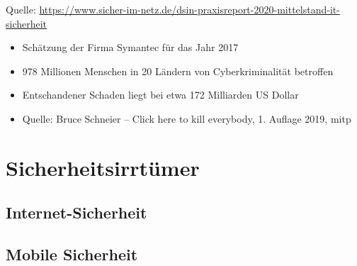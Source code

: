 \begin{frame}
\begin{center}

\end{center}
\scriptsize Quelle: \href{https://www.sicher-im-netz.de/dsin-praxisreport-2020-mittelstand-it-sicherheit}{https://www.sicher-im-netz.de/dsin-praxisreport-2020-mittelstand-it-sicherheit}
\end{frame}


\begin{frame}
\begin{itemize}
  \item Schätzung der Firma Symantec für das Jahr 2017
  \item 978 Millionen Menschen in 20 Ländern von Cyberkriminalität betroffen
  \item Entschandener Schaden liegt bei etwa 172 Milliarden US Dollar
  \item Quelle: Bruce Schneier -- Click here to kill everybody, 1. Auflage 2019, mitp
\end{itemize}
\end{frame}

\section{Sicherheitsirrtümer}

\subsection{Internet-Sicherheit}



\subsection{Mobile Sicherheit}

